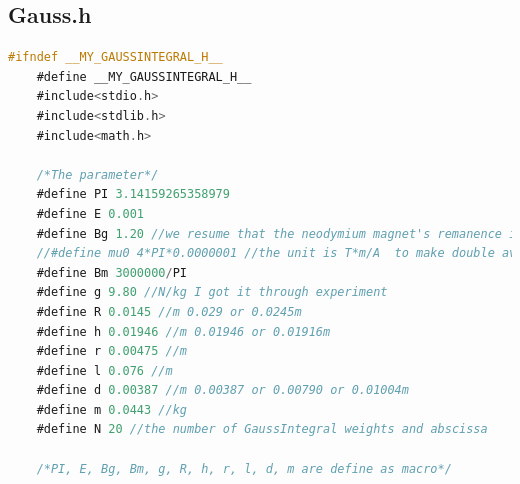 \documentclass[AutoFakeBold]{LZUThesis}
\begin{document}
\subsection{Gauss.h}
\begin{lstlisting}[language = C]
    #ifndef __MY_GAUSSINTEGRAL_H__
    #define __MY_GAUSSINTEGRAL_H__
    #include<stdio.h>
    #include<stdlib.h>
    #include<math.h>
    
    /*The parameter*/
    #define PI 3.14159265358979
    #define E 0.001
    #define Bg 1.20 //we resume that the neodymium magnet's remanence is the averger value of 1.18-1.22T which is the N35's parameter
    //#define mu0 4*PI*0.0000001 //the unit is T*m/A  to make double available, we chose to use Bg/mu0 which we called Bm.
    #define Bm 3000000/PI
    #define g 9.80 //N/kg I got it through experiment
    #define R 0.0145 //m 0.029 or 0.0245m
    #define h 0.01946 //m 0.01946 or 0.01916m
    #define r 0.00475 //m
    #define l 0.076 //m
    #define d 0.00387 //m 0.00387 or 0.00790 or 0.01004m
    #define m 0.0443 //kg
    #define N 20 //the number of GaussIntegral weights and abscissa
    
    /*PI, E, Bg, Bm, g, R, h, r, l, d, m are define as macro*/
    

\end{lstlisting}
\end{document}
